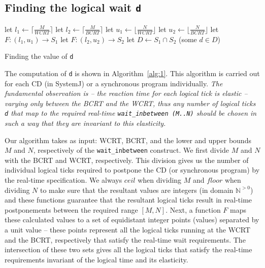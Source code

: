 \subsection{Finding the logical wait \texttt{d}}
\label{sec:find-logic-delay}

\begin{algorithm}[t!]
  \begin{minipage}{1.0\linewidth}
    \SetAlgoLined
    let $l_1 \leftarrow \lceil \frac{M}{WCRT} \rceil$\;
    let $l_2 \leftarrow \lceil \frac{M}{BCRT} \rceil$\;
    let $u_1 \leftarrow \lfloor \frac{N}{WCRT} \rfloor$\;
    let $u_2 \leftarrow \lfloor \frac{N}{BCRT} \rfloor$\;
    let $F:(l_1,u_1) \rightarrow S_1$\;
    let $F:(l_2,u_2) \rightarrow S_2$\;
    let $D \leftarrow S_1 \cap S_2$\;
    \Return (some $d \in D$)\;
    \caption{Finding the value of \texttt{d}}
    \label{alg:1}
  \end{minipage}
\end{algorithm}

The computation of \texttt{d} is shown in Algorithm~\ref{alg:1}. This
algorithm is carried out for each CD (in SystemJ) or a synchronous
program individually. \textit{The fundamental observation is -- the
  reaction time for each logical tick is elastic -- varying only between
  the BCRT and the WCRT, thus any number of logical ticks \texttt{d}
  that map to the required real-time \mbox{\texttt{wait\_inbetween
      (M..N)}} should be chosen in such a way that they are invariant to
  this elasticity.}

Our algorithm takes as input: WCRT, BCRT, and the lower and upper bounds
$M$ and $N$, respectively of the \texttt{wait\_inbetween} construct. We
first divide $M$ and $N$ with the BCRT and WCRT, respectively. This
division gives us the number of individual logical ticks required to
postpone the CD (or synchronous program) by the real-time
specification. We always $ceil$ when dividing $M$ and $floor$ when
dividing $N$ to make sure that the resultant values are integers (in
domain $\mathbb{N}^{>0}$) and these functions guarantee that the
resultant logical ticks result in real-time postponements between the
required range $[M,N]$. Next, a function $F$ maps these calculated
values to a set of equidistant integer points (values) separated by a
unit value -- these points represent all the logical ticks running at
the WCRT and the BCRT, respectively that satisfy the real-time wait
requirements. The intersection of these two sets gives all the logical
ticks that satisfy the real-time requirements invariant of the logical
time and its elasticity.

